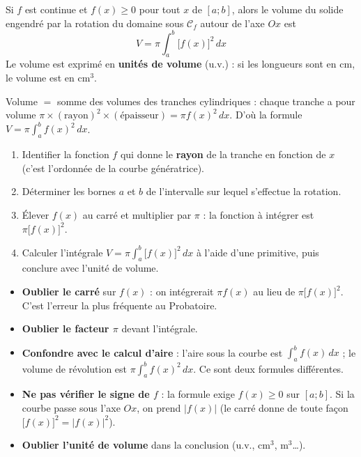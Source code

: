 \documentclass[11pt]{article}
\newcounter{popsec}
\newcounter{popsub}
\newcommand{\courssub}[1]{%
  \stepcounter{popsub}%
  \par\vspace{9pt}\noindent{\popxbold\fontsize{11.5}{13}\selectfont\color{popink}{\color{poporange}\thepopsec.\thepopsub}\hspace{6pt}#1}\par\nopagebreak\vspace{4pt}
}
\begin{document}
\begin{propriete}
Si $f$ est continue et $f(x)\ge 0$ pour tout $x$ de $[a;b]$, alors le volume du solide engendré par la rotation du domaine sous $\mathcal{C}_f$ autour de l'axe $Ox$ est
\[
V = \pi \int_a^b \bigl[f(x)\bigr]^2 \,dx
\]
Le volume est exprimé en \textbf{unités de volume} (u.v.) : si les longueurs sont en cm, le volume est en $\text{cm}^3$.
\end{propriete}

\begin{aretenir}
Volume $=$ somme des volumes des tranches cylindriques : chaque tranche a pour volume $\pi \times (\text{rayon})^2 \times (\text{épaisseur}) = \pi f(x)^2 \, dx$. D'où la formule $V = \pi \displaystyle\int_a^b f(x)^2\,dx$.
\end{aretenir}

\courssub{Méthode de calcul}

\begin{methode}
\begin{enumerate}
\item Identifier la fonction $f$ qui donne le \textbf{rayon} de la tranche en fonction de $x$ (c'est l'ordonnée de la courbe génératrice).
\item Déterminer les bornes $a$ et $b$ de l'intervalle sur lequel s'effectue la rotation.
\item Élever $f(x)$ au carré et multiplier par $\pi$ : la fonction à intégrer est $\pi \bigl[f(x)\bigr]^2$.
\item Calculer l'intégrale $\displaystyle V=\pi\int_a^b \bigl[f(x)\bigr]^2\,dx$ à l'aide d'une primitive, puis conclure avec l'unité de volume.
\end{enumerate}
\end{methode}

\begin{attention}
\begin{itemize}
\item \textbf{Oublier le carré} sur $f(x)$ : on intégrerait $\pi f(x)$ au lieu de $\pi \bigl[f(x)\bigr]^2$. C'est l'erreur la plus fréquente au Probatoire.
\item \textbf{Oublier le facteur $\pi$} devant l'intégrale.
\item \textbf{Confondre avec le calcul d'aire} : l'aire sous la courbe est $\displaystyle\int_a^b f(x)\,dx$ ; le volume de révolution est $\pi\displaystyle\int_a^b f(x)^2\,dx$. Ce sont deux formules différentes.
\item \textbf{Ne pas vérifier le signe de $f$} : la formule exige $f(x)\ge 0$ sur $[a;b]$. Si la courbe passe sous l'axe $Ox$, on prend $|f(x)|$ (le carré donne de toute façon $\bigl[f(x)\bigr]^2 = |f(x)|^2$).
\item \textbf{Oublier l'unité de volume} dans la conclusion (u.v., $\text{cm}^3$, $\text{m}^3$\ldots).
\end{itemize}
\end{attention}
\end{document}
